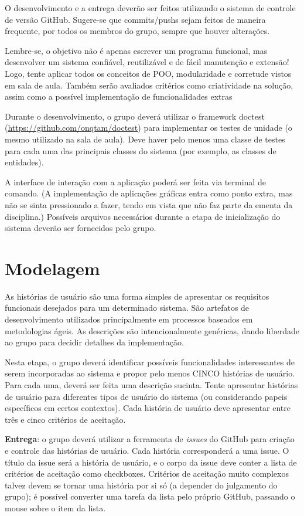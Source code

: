 \documentclass[11pt]{article}
\begin{document}
O desenvolvimento e a entrega deverão ser feitos utilizando o sistema
de controle de versão GitHub. Sugere-se que commits/pushs sejam feitos
de maneira frequente, por todos os membros do grupo, sempre que houver
alterações.

Lembre-se, o objetivo não é apenas escrever um programa funcional, mas
desenvolver um sistema confiável, reutilizável e de fácil manutenção e
extensão! Logo, tente aplicar todos os conceitos de POO, modularidade
e corretude vistos em sala de aula. Também serão avaliados critérios
como criatividade na solução, assim como a possível implementação de
funcionalidades extras

Durante o desenvolvimento, o grupo deverá utilizar o framework doctest
(\url{https://github.com/onqtam/doctest}) para implementar os testes de
unidade (o mesmo utilizado na sala de aula). Deve haver pelo menos uma
classe de testes para cada uma das principais classes do sistema (por
exemplo, as classes de entidades).

A interface de interação com a aplicação poderá ser feita via terminal
de comando. (A implementação de aplicações gráficas entra como ponto
extra, mas não se sinta pressionado a fazer, tendo em vista que não
faz parte da ementa da disciplina.) Possíveis arquivos necessários
durante a etapa de inicialização do sistema deverão ser fornecidos
pelo grupo.
\section{Modelagem}
\label{sec:org2f5eb95}

As histórias de usuário são uma forma simples de apresentar os requisitos
funcionais desejados para um determinado sistema. São artefatos de
desenvolvimento utilizados principalmente em processos baseados em
metodologias ágeis. As descrições são intencionalmente genéricas,
dando liberdade ao grupo para decidir detalhes da implementação.

Nesta etapa, o grupo deverá identificar possíveis funcionalidades
interessantes de serem incorporadas ao sistema e propor pelo menos
CINCO histórias de usuário. Para cada uma, deverá ser feita uma
descrição sucinta. Tente apresentar histórias de usuário para
diferentes tipos de usuário do sistema (ou considerando papeis
específicos em certos contextos). Cada história de usuário deve
apresentar entre três e cinco critérios de aceitação.

\textbf{Entrega}: o grupo deverá utilizar a ferramenta de \emph{issues} do GitHub para
criação e controle das histórias de usuário. Cada história
corresponderá a uma issue. O título da issue será a história de
usuário, e o corpo da issue deve conter a lista de critérios de
aceitação como checkboxes. Critérios de aceitação muito complexos
talvez devem se tornar uma história por si só (a depender do
julgamento do grupo); é possível converter uma tarefa da lista pelo
próprio GitHub, passando o mouse sobre o item da lista.
\end{document}
